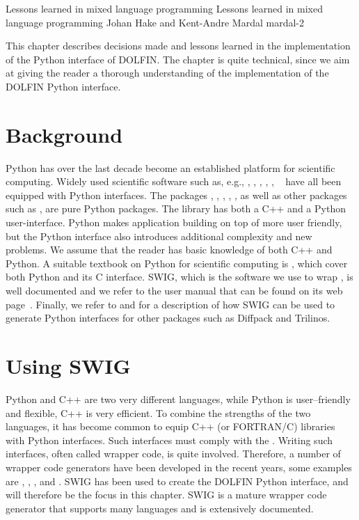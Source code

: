               {Lessons learned in mixed language programming}
              {Lessons learned in mixed language programming}
              {Johan Hake and Kent-Andre Mardal}
              {mardal-2}

This chapter describes decisions made and lessons learned in the
implementation of the Python interface of DOLFIN. The chapter is quite
technical, since we aim at giving the reader a thorough understanding
of the implementation of the DOLFIN Python interface.

\section{Background}

Python has over the last decade become an established platform for
scientific computing. Widely used scientific software such as,
e.g., \citet{www:petsc}, \citet{www:hypre}, \citet{www:trilinos},
\citet{www:vtk}, \citet{www:vmtk}, \ginac~\citep{BauerFrinkKreckel2000}
have all been equipped with Python interfaces. The \fenics
packages \ferari, \fiat , \ffc, \ufl, \viper, as well as other
packages such as \sympy\citep{CertikSeoanePetersonEtAl2009},
\scipy\citep{JonesOliphantPetersonEtAl2009} are pure Python packages.
The \dolfin library has both a C++ and a Python user-interface. Python
makes application building on top of \dolfin more user friendly,
but the Python interface also introduces additional complexity and
new problems. We assume that the reader has basic knowledge of
both C++ and Python. A suitable textbook on Python for scientific
computing is \citet{Langtangen2008}, which cover both Python and its
C interface.  SWIG, which is the software we use to wrap \dolfin, is
well documented and we refer to the user manual that can be found on its
web page~\citep{www:swig}. Finally, we refer to \citet{Langtangen2003b}
and \citet{SalaSpotzHeroux2008} for a description of how SWIG can be
used to generate Python interfaces for other packages such as Diffpack
and Trilinos.

\section{Using SWIG}

Python and C++ are two very different languages, while Python is
user--friendly and flexible, C++ is very efficient.  To combine the
strengths of the two languages, it has become common to equip C++ (or
FORTRAN/C) libraries with Python interfaces.  Such interfaces must comply
with the \citet{www:python-capi}.  Writing such interfaces, often called
wrapper code, is quite involved.  Therefore, a number of wrapper code
generators have been developed in the recent years, some examples are
\citet{Peterson}, \citet{SIP}, \citet{Siloon}, and \citet{www:swig}.
SWIG has been used to create the DOLFIN Python interface, and will
therefore be the focus in this chapter. SWIG is a mature wrapper code
generator that supports many languages and is extensively documented.

